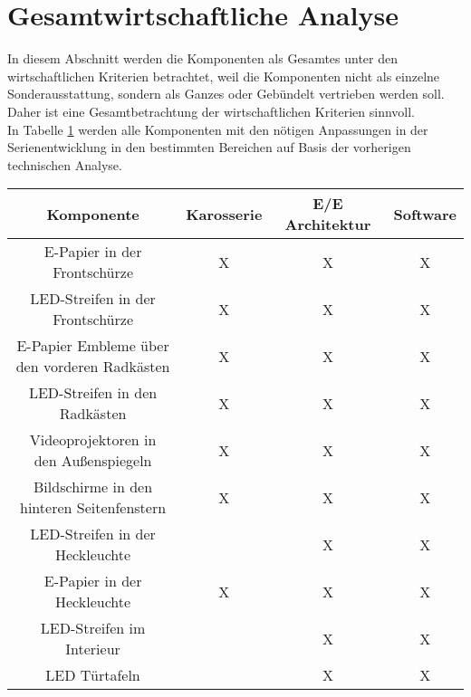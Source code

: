 \section{Gesamtwirtschaftliche Analyse}
In diesem Abschnitt werden die Komponenten als Gesamtes unter den wirtschaftlichen Kriterien betrachtet, weil die Komponenten nicht als einzelne Sonderausstattung, sondern als Ganzes oder Gebündelt vertrieben werden soll. Daher ist eine Gesamtbetrachtung der wirtschaftlichen Kriterien sinnvoll. \\
In Tabelle \ref{tab:Entwicklung} werden alle Komponenten mit den nötigen Anpassungen in der Serienentwicklung in den bestimmten Bereichen auf Basis der vorherigen technischen Analyse. 
\begin{table}[hbt]	
	\centering
	\renewcommand{\arraystretch}{1.5}	%
	\label{tab:Entwicklung}
	\begin{tabular}{c|ccc}
		\textbf{Komponente} & \textbf{Karosserie} & \textbf{E/E Architektur} & \textbf{Software} \\ 
		\hline 
		\hline 
		\parbox[t]{0.4\linewidth}{\centering E-Papier in der Frontschürze} & X & X & X \\
		\parbox[t]{0.4\linewidth}{\centering LED-Streifen in der Frontschürze} & X & X & X \\
		\parbox[t]{0.4\linewidth}{\centering E-Papier Embleme über\\den vorderen Radkästen} & X & X & X \\
		\parbox[t]{0.4\linewidth}{\centering LED-Streifen in den Radkästen} & X & X & X \\
		\parbox[t]{0.4\linewidth}{\centering Videoprojektoren in\\den Außenspiegeln} & X & X & X \\
		\parbox[t]{0.4\linewidth}{\centering Bildschirme in den\\hinteren Seitenfenstern} & X & X & X \\
		\parbox[t]{0.4\linewidth}{\centering LED-Streifen in der Heckleuchte} &  & X & X \\
		\parbox[t]{0.4\linewidth}{\centering E-Papier in der Heckleuchte} & X & X & X \\
		\parbox[t]{0.4\linewidth}{\centering LED-Streifen im Interieur} &  & X & X \\
		\parbox[t]{0.4\linewidth}{\centering LED Türtafeln} &  & X & X \\

\end{tabular}
\end{table}
